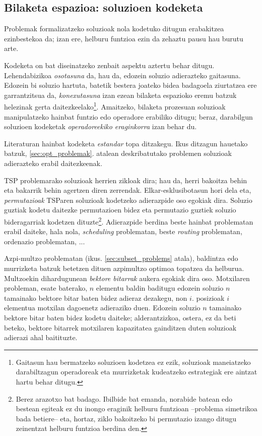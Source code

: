 \documentclass[eu]{ifirak}\usepackage[]{graphicx}\usepackage[]{color}
\begin{document}
\subsection{Bilaketa espazioa: soluzioen kodeketa}

Problemak formalizatzeko soluzioak nola kodetuko ditugun erabakitzea ezinbestekoa da; izan ere, helburu funtzioa ezin da zehaztu pausu hau burutu arte.

Kodeketa on bat diseinatzeko zenbait aspektu aztertu behar ditugu. Lehendabizikoa \textit{osotasuna} da, hau da, edozein soluzio adierazteko gaitasuna. Edozein bi soluzio hartuta, batetik bestera joateko bidea badagoela ziurtatzea ere garrantzitsua da, \textit{konexutasuna} izan ezean bilaketa espazioko eremu batzuk helezinak gerta daitezkeelako\footnote{Gaitasun hau bermatzeko soluzioen kodetzea ez ezik, soluzioak maneiatzeko darabiltzagun operadoreak eta murrizketak kudeatzeko estrategiak ere aintzat hartu behar ditugu.}. Amaitzeko, bilaketa prozesuan soluzioak manipulatzeko hainbat funtzio edo operadore erabiliko ditugu; beraz, darabilgun soluzioen kodeketak \textit{operadoreekiko eraginkorra} izan behar du.

Literaturan hainbat kodeketa \textit{estandar} topa ditzakegu. Ikus ditzagun hauetako batzuk, \ref{sec:opt_problemak}. atalean deskribatutako problemen soluzioak adierazteko erabil daitezkeenak.

TSP problemarako soluzioak herrien zikloak dira; hau da, herri bakoitza behin eta bakarrik behin agertzen diren zerrendak. Elkar-esklusibotasun hori dela eta, \textit{permutazioak} TSParen soluzioak kodetzeko adierazpide oso egokiak dira. Soluzio guztiak kodetu daitezke permutazioen bidez eta permutazio guztiek soluzio bideragarriak kodetzen dituzte\footnote{Berez arazotxo bat badago. Ibilbide bat emanda, norabide batean edo bestean egiteak ez du inongo eraginik helburu funtzioan --problema simetrikoa bada betiere-- eta, hortaz, ziklo bakoitzeko bi permutazio izango ditugu zeinentzat helburu funtzioa berdina den.}. Adierazpide berdina beste hainbat problematan erabil daiteke, hala nola, \textit{scheduling} problematan, beste \textit{routing} problematan, ordenazio problematan, ... 

Azpi-multzo problematan (ikus. \ref{sec:subset_problems} atala), baldintza edo murrizketa batzuk betetzen dituen azpimultzo optimoa topatzea da helburua. Multzoekin dihardugunean \textit{bektore bitarrak} aukera egokiak dira oso. Motxilaren probleman, esate baterako, $n$ elementu baldin baditugu edozein soluzio $n$ tamainako bektore bitar baten bidez adieraz dezakegu, non $i$. posizioak $i$ elementua motxilan dagoenetz adieraziko duen. Edozein soluzio $n$ tamainako bektore bitar baten bidez kodetu daiteke; alderantzizkoa, ostera, ez da beti beteko, bektore bitarrek motxilaren kapazitatea gainditzen duten soluzioak adierazi ahal baitituzte.
\end{document}

